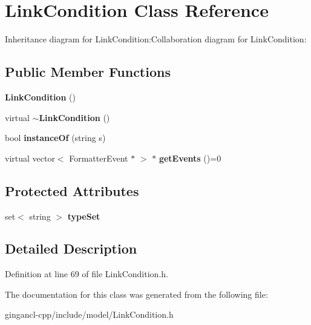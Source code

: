 \section{LinkCondition Class Reference}
\label{classbr_1_1pucrio_1_1telemidia_1_1ginga_1_1ncl_1_1model_1_1link_1_1LinkCondition}
Inheritance diagram for LinkCondition:Collaboration diagram for LinkCondition:\subsection*{Public Member Functions}
\begin{CompactItemize}
\item 
{\bf LinkCondition} ()\label{classbr_1_1pucrio_1_1telemidia_1_1ginga_1_1ncl_1_1model_1_1link_1_1LinkCondition_48085d0133e71dc4e00ba24a6573c478}

\item 
virtual {\bf $\sim$LinkCondition} ()\label{classbr_1_1pucrio_1_1telemidia_1_1ginga_1_1ncl_1_1model_1_1link_1_1LinkCondition_99c6dd5c01196a6b226c4c40d8b7bb0a}

\item 
bool {\bf instanceOf} (string s)\label{classbr_1_1pucrio_1_1telemidia_1_1ginga_1_1ncl_1_1model_1_1link_1_1LinkCondition_4081cb1ebb5adebc1d0858ff6f69af0d}

\item 
virtual vector$<$ FormatterEvent $\ast$ $>$ $\ast$ \textbf{getEvents} ()=0\label{classbr_1_1pucrio_1_1telemidia_1_1ginga_1_1ncl_1_1model_1_1link_1_1LinkCondition_8e62c6fde84172b6262fece11f155a89}

\end{CompactItemize}
\subsection*{Protected Attributes}
\begin{CompactItemize}
\item 
set$<$ string $>$ {\bf typeSet}\label{classbr_1_1pucrio_1_1telemidia_1_1ginga_1_1ncl_1_1model_1_1link_1_1LinkCondition_145b3afaa194308141d367cc1393d565}

\end{CompactItemize}


\subsection{Detailed Description}




Definition at line 69 of file LinkCondition.h.

The documentation for this class was generated from the following file:\begin{CompactItemize}
\item 
gingancl-cpp/include/model/LinkCondition.h\end{CompactItemize}
